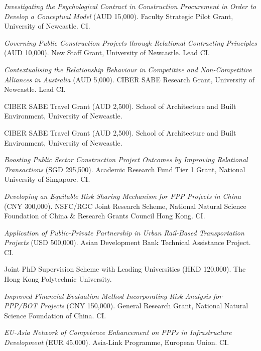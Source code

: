 \documentclass[11pt,a4paper]{report} %
\begin{document}
\begin{tablist}
        \item[2014] \tab{}\textit{Investigating the Psychological Contract in Construction Procurement in Order to Develop a Conceptual Model} (AUD 15,000). Faculty Strategic Pilot Grant, University of Newcastle. CI.
        
        \item[2014] \tab{}\textit{Governing Public Construction Projects through Relational Contracting Principles} (AUD 10,000). New Staff Grant, University of Newcastle. Lead CI.
        
        \item[2014] \tab{}\textit{Contextualising the Relationship Behaviour in Competitive and Non-Competitive Alliances in Australia} (AUD 5,000). CIBER SABE Research Grant, University of Newcastle. Lead CI.
        
        \item[2014] \tab{}CIBER SABE Travel Grant (AUD 2,500). School of Architecture and Built Environment, University of Newcastle.
        
        \item[2013] \tab{}CIBER SABE Travel Grant (AUD 2,500). School of Architecture and Built Environment, University of Newcastle.
        
        \item[2010--13] \tab{}\textit{Boosting Public Sector Construction Project Outcomes by Improving Relational Transactions} (SGD 295,500). Academic Research Fund Tier 1 Grant, National University of Singapore. CI.

        \item[2008--10] \tab{}\textit{Developing an Equitable Risk Sharing Mechanism for PPP Projects in China} (CNY 300,000). NSFC/RGC Joint Research Scheme, National Natural Science Foundation of China \& Research Grants Council Hong Kong. CI.
        
        \item[2007--08] \tab{}\textit{Application of Public-Private Partnership in Urban Rail-Based Transportation Projects} (USD 500,000). Asian Development Bank Technical Assistance Project. CI.
        
        \item[2007--08] \tab{}Joint PhD Supervision Scheme with Leading Universities (HKD 120,000). The Hong Kong Polytechnic University.
        
        \item[2005--07] \tab{}\textit{Improved Financial Evaluation Method Incorporating Risk Analysis for PPP/BOT Projects} (CNY 150,000). General Research Grant, National Natural Science Foundation of China. CI.
        
        \item[2004--07] \tab{}\textit{EU-Asia Network of Competence Enhancement on PPPs in Infrastructure Development} (EUR 45,000). Asia-Link Programme, European Union. CI.
        
    \end{tablist}
\end{document}
